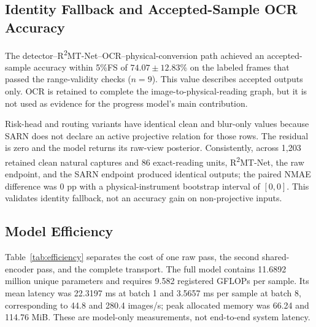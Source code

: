 \documentclass[electronics,article,submit,oneauthor]{Definitions/mdpi}
\newcommand{\modelname}{R\textsuperscript{2}MT-Net}
\begin{document}
\subsection{Identity Fallback and Accepted-Sample OCR Accuracy}
\label{subsec:system_results}

The detector--\modelname--OCR--physical-conversion path achieved an accepted-sample accuracy within 5\%FS of $74.07\pm12.83$\% on the labeled frames that passed the range-validity checks ($n=9$). This value describes accepted outputs only. OCR is retained to complete the image-to-physical-reading graph, but it is not used as evidence for the progress model's main contribution.

Risk-head and routing variants have identical clean and blur-only values because SARN does not declare an active projective relation for those rows. The residual is zero and the model returns its raw-view posterior. Consistently, across 1,203 retained clean natural captures and 86 exact-reading units, \modelname, the raw endpoint, and the SARN endpoint produced identical outputs; the paired NMAE difference was 0 pp with a physical-instrument bootstrap interval of $[0,0]$. This validates identity fallback, not an accuracy gain on non-projective inputs.

\subsection{Model Efficiency}
\label{subsec:efficiency_results}

Table~\ref{tab:efficiency} separates the cost of one raw pass, the second shared-encoder pass, and the complete transport. The full model contains 11.6892 million unique parameters and requires 9.582 registered GFLOPs per sample. Its mean latency was 22.3197 ms at batch 1 and 3.5657 ms per sample at batch 8, corresponding to 44.8 and 280.4 images/s; peak allocated memory was 66.24 and 114.76 MiB. These are model-only measurements, not end-to-end system latency.
\end{document}
